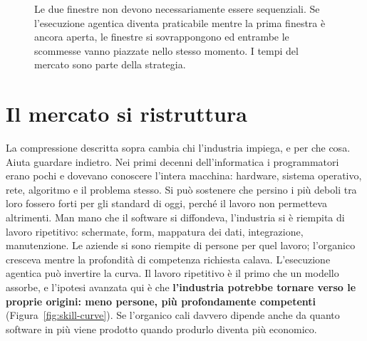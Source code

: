 \documentclass[10pt,oneside,openany]{book}
\begin{document}
\begin{figure}[!htbp]
{}
\caption{Le due finestre non devono necessariamente essere sequenziali. Se l'esecuzione agentica diventa praticabile mentre la prima finestra è ancora aperta, le finestre si sovrappongono ed entrambe le scommesse vanno piazzate nello stesso momento. I tempi del mercato sono parte della strategia.}
\label{fig:parallel-windows}
\end{figure}

\FloatBarrier
\section{Il mercato si ristruttura}\label{sec:market}

La compressione descritta sopra cambia chi l'industria impiega, e per che cosa. Aiuta guardare indietro. Nei primi decenni dell'informatica i programmatori erano pochi e dovevano conoscere l'intera macchina: hardware, sistema operativo, rete, algoritmo e il problema stesso. Si può sostenere che persino i più deboli tra loro fossero forti per gli standard di oggi, perché il lavoro non permetteva altrimenti. Man mano che il software si diffondeva, l'industria si è riempita di lavoro ripetitivo: schermate, form, mappatura dei dati, integrazione, manutenzione. Le aziende si sono riempite di persone per quel lavoro; l'organico cresceva mentre la profondità di competenza richiesta calava. L'esecuzione agentica può invertire la curva. Il lavoro ripetitivo è il primo che un modello assorbe, e l'ipotesi avanzata qui è che \textbf{l'industria potrebbe tornare verso le proprie origini: meno persone, più profondamente competenti} (Figura~\ref{fig:skill-curve}). Se l'organico cali davvero dipende anche da quanto software in più viene prodotto quando produrlo diventa più economico.
\end{document}

